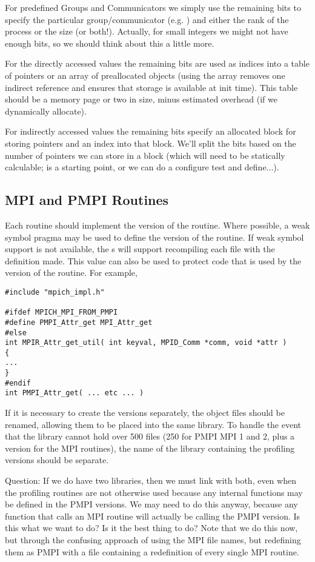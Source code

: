 \documentclass{article}
\begin{document}
For predefined Groups and Communicators we simply use the remaining bits
to specify the particular group/communicator (e.g. ) and 
either the rank of the process or the size (or both!).  Actually, for
small integers we  
might not have enough bits, so we should think about this a little more.

For the directly accessed values the remaining bits are used as indices into
a table of pointers or an array of preallocated objects (using the array
removes one indirect reference and ensures that storage is available at init
time).  This table should be 
a memory page or two in size, 
minus estimated  overhead (if we dynamically allocate).

For indirectly accessed values the remaining bits specify an allocated block
for storing pointers and an index into that block.  We'll split the bits
based on the number of pointers we can store in a block (which will need
to be statically calculable;  is a starting point, or we
can  do a configure test and define...).

\subsection{MPI and PMPI Routines}
Each routine should implement the  version of the routine.
Where possible, a weak symbol pragma may be used to define the
 version of the routine.  If weak symbol support is not
available, the s will support recompiling each file
with the definition  made.  This value
can also be used to protect code that is used by the 
version of the routine.  For example, 
\begin{verbatim}
#include "mpich_impl.h"

#ifdef MPICH_MPI_FROM_PMPI
#define PMPI_Attr_get MPI_Attr_get
#else
int MPIR_Attr_get_util( int keyval, MPID_Comm *comm, void *attr )
{
...
}
#endif
int PMPI_Attr_get( ... etc ... )
\end{verbatim}

If it is necessary to create the  versions separately, the
object files should be renamed, allowing them to be placed into the
same library.  To handle the event that the library cannot hold over
500 files (250 for PMPI MPI 1 and 2, plus a version for the MPI
routines), the name of the library containing the profiling versions
should be separate.

Question: If we do have two libraries, then we must link with both,
even when the profiling routines are not otherwise used because any
internal functions may be defined in the PMPI versions.  We may need
to do this anyway, because any function that calls an MPI routine will
actually be calling the PMPI version.  Is this what we want to do?  Is
it the best thing to do?  Note that we do this now, but through the
confusing approach of using the MPI file names, but redefining them as PMPI
with a file containing a redefinition of every single MPI routine.
\end{document}
